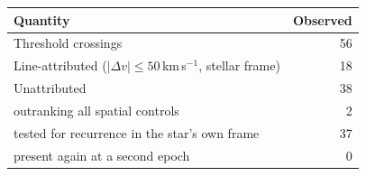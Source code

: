 \begin{tabular}{@{}lr@{}}
\hline
Quantity & Observed \\
\hline
Threshold crossings & 56 \\
Line-attributed ($|\Delta v|\leq50$\,km\,s$^{-1}$, stellar frame) & 18 \\
Unattributed & 38 \\
\quad outranking all spatial controls & 2 \\
\quad tested for recurrence in the star's own frame & 37 \\
\quad present again at a second epoch & 0 \\
\hline
\end{tabular}
